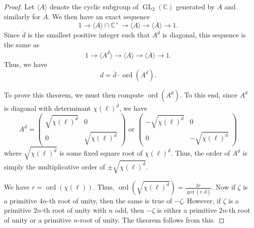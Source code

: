 \documentclass[11pt]{amsart}
\theoremstyle{plain}
\theoremstyle{definition}
\newcommand{\C}{{\mathbb C}}
\DeclareMathOperator{\ord}{ord}
\DeclareMathOperator{\GL}{GL}
\renewcommand{\[}{\left[}
\renewcommand{\]}{\right]}
\newcommand{\dbar}{\overline{d}}
\begin{document}
\begin{proof}
Let $\langle A \rangle$ denote the cyclic subgroup of $\GL_2(\C)$ generated by $A$ and similarly for $\overline{A}$.  
We then have an exact sequence
$$
1 \to \langle A \rangle \cap \C^\times \to \langle A \rangle \to \langle \overline{A} \rangle \to 1.
$$
Since $\dbar$ is the smallest positive integer such that $A^{\dbar}$ is diagonal, this sequence is the same as 
$$
1 \to \langle A^{\dbar} \rangle  \to \langle A \rangle \to \langle \overline{A} \rangle \to 1.
$$
Thus, we have
$$
d = \dbar \cdot \ord(A^{\dbar}).
$$


To prove this theorem, we must then compute $\ord(A^{\dbar})$.  To this end, since $A^{\dbar}$ is diagonal with determinant $\chi(\ell)^{\dbar}$, we have
$$
A^{\dbar} = 
\begin{pmatrix}   \sqrt{\chi(\ell)^{\dbar}} & 0 \\ 0 & \sqrt{\chi(\ell)^{\dbar}} \end{pmatrix}
\text{~or~}
\begin{pmatrix}   -\sqrt{\chi(\ell)^{\dbar}} & 0 \\ 0 & -\sqrt{\chi(\ell)^{\dbar}} \end{pmatrix}
$$
where $\sqrt{\chi(\ell)^{\dbar}}$ is some fixed square root of ${\chi(\ell)^{\dbar}}$.
Thus, the order of $A^{\dbar}$ is simply the multiplicative order of $\pm  \sqrt{\chi(\ell)^{\dbar}}$.

We have $r = \ord(\chi(\ell))$.  Thus, $\ord(\sqrt{\chi(\ell)^{\dbar}}) = \displaystyle \frac{2r}{\gcd(r,\dbar)}$.  Now if $\zeta$ is a primitive $4n$-th root of unity, then the same is true of $-\zeta$.  However, if $\zeta$ is a primitive $2n$-th root of unity with $n$ odd, then $-\zeta$ is either a primitive $2n$-th root of unity or a primitive $n$-root of unity.  The theorem follows from this.
\end{proof}
\end{document}
